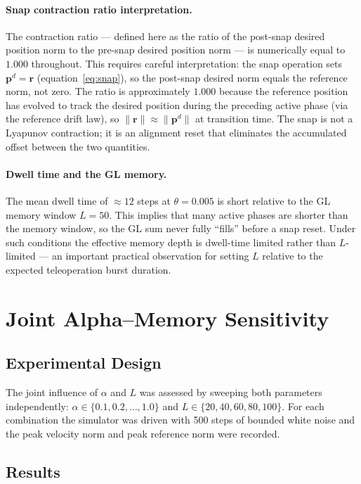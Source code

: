 \documentclass[11pt,a4paper]{article}
\theoremstyle{definition}
\begin{document}
\paragraph{Snap contraction ratio interpretation.}
The contraction ratio — defined here as the ratio of the post-snap desired
position norm to the pre-snap desired position norm — is numerically equal to
$1.000$ throughout.  This requires careful interpretation: the snap operation
sets $\bm{p}^d = \bm{r}$ (equation~\eqref{eq:snap}), so the post-snap
desired norm equals the reference norm, not zero.  The ratio is approximately
$1.000$ because the reference position has evolved to track the desired
position during the preceding active phase (via the reference drift law), so
$\|\bm{r}\| \approx \|\bm{p}^d\|$ at transition time.  The snap is not a
Lyapunov contraction; it is an alignment reset that eliminates the
accumulated offset between the two quantities.

\paragraph{Dwell time and the GL memory.}
The mean dwell time of $\approx 12$ steps at $\theta = 0.005$ is short
relative to the GL memory window $L = 50$.  This implies that many active
phases are shorter than the memory window, so the GL sum never fully ``fills''
before a snap reset.  Under such conditions the effective memory depth is
dwell-time limited rather than $L$-limited — an important practical
observation for setting $L$ relative to the expected teleoperation burst
duration.

\section{Joint Alpha–Memory Sensitivity}
\label{sec:alpha_mem}

\subsection{Experimental Design}

The joint influence of $\alpha$ and $L$ was assessed by sweeping both
parameters independently: $\alpha \in \{0.1, 0.2, \ldots, 1.0\}$ and
$L \in \{20, 40, 60, 80, 100\}$.  For each combination the simulator was
driven with 500 steps of bounded white noise and the peak velocity norm and
peak reference norm were recorded.

\subsection{Results}
\end{document}
